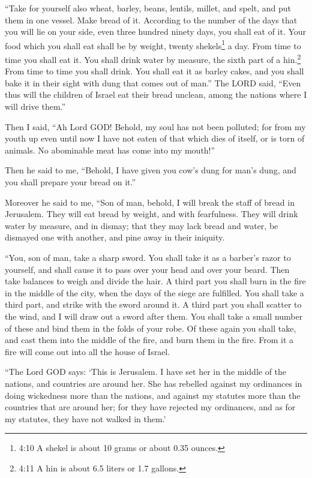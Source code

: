 \myverse{}“Take for yourself also wheat, barley, beans, lentils, millet,
and spelt, and put them in one vessel. Make bread of it. According to the number of the days that you
will lie on your side, even three hundred ninety days, you shall eat of it.
\myverse{}Your food which you shall eat shall be by weight, twenty shekels\footnote{4:10 A shekel is about 10 grams or about 0.35 ounces.} a day. From time to time you shall
eat it.
\myverse{}You shall drink water by measure, the sixth part of a hin.\footnote{4:11 A hin is about 6.5 liters or 1.7 gallons.} From time to time you shall drink.
\myverse{}You shall eat it as barley cakes, and you shall bake it in their sight with
dung that comes out of man.”
\myverse{}The LORD said, “Even thus will the children of Israel eat their bread unclean,
among the nations where I will drive them.”

\myverse{}Then I said, “Ah Lord GOD! Behold, my soul has not been polluted;
for from my youth up even until now I have not eaten of that which dies of itself, or is torn of animals.
No abominable meat has come into my mouth!”

\myverse{}Then he said to me, “Behold, I have given you cow’s dung for
man’s dung, and you shall prepare your bread on it.”

\myverse{}Moreover he said to me, “Son of man, behold, I will break the
staff of bread in Jerusalem. They will eat bread by weight, and with fearfulness. They will drink water
by measure, and in dismay;
\myverse{}that they may lack bread and water, be dismayed one with another, and pine
away in their iniquity.


\mychapter{} \myverse*{}“You, son of man, take a sharp sword. You shall take it as a barber’s
razor to yourself, and shall cause it to pass over your head and over your beard. Then take balances to
weigh and divide the hair.
\myverse{}A third part you shall burn in the fire in the middle of the city, when the
days of the siege are fulfilled. You shall take a third part, and strike with the sword around it. A third
part you shall scatter to the wind, and I will draw out a sword after them.
\myverse{}You shall take a small number of these and bind them in the folds of your robe.
\myverse{}Of these again you shall take, and cast them into the middle of the fire, and
burn them in the fire. From it a fire will come out into all the house of Israel.

\myverse{}“The Lord GOD says: ‘This is Jerusalem. I have set her in the middle
of the nations, and countries are around her.
\myverse{}She has rebelled against my ordinances in doing wickedness more than the nations,
and against my statutes more than the countries that are around her; for they have rejected my ordinances,
and as for my statutes, they have not walked in them.’


